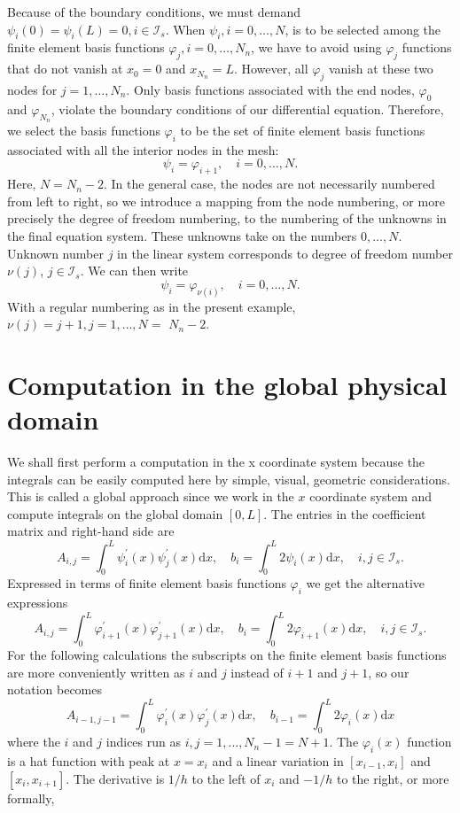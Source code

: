 \documentclass[../main.tex]{subfiles}
\begin{document}
		\noindent Because of the boundary conditions, we must demand $\psi_{i}(0)=\psi_{i}(L)=0, i \in \mathcal{I}_{s}$. When $\psi_{i}, i=0, \ldots, N$, is to be selected among the finite element basis functions $\varphi_{j}, i=0, \ldots, N_{n}$, we have to avoid using $\varphi_{j}$ functions that do not vanish at $x_{0}=0$ and $x_{N_{n}}=L$. However, all $\varphi_{j}$ vanish at these two nodes for $j=1, \ldots, N_{n}$. Only basis functions associated with the end nodes, $\varphi_{0}$ and $\varphi_{N_{n}}$, violate the boundary conditions of our differential equation. Therefore, we select the basis functions $\varphi_{i}$ to be the set of finite element basis functions associated with all the interior nodes in the mesh:
		$$
		\psi_{i}=\varphi_{i+1}, \quad i=0, \ldots, N .
		$$
		Here, $N=N_{n}-2$.\smallbreak
		In the general case, the nodes are not necessarily numbered from left to right, so we introduce a mapping from the node numbering, or more precisely the degree of freedom numbering, to the numbering of the unknowns in the final equation system. These unknowns take on the numbers $0, \ldots, N$. Unknown number $j$ in the linear system corresponds to degree of freedom number $\nu(j)$, $j \in \mathcal{I}_{s}$. We can then write
		$$
		\psi_{i}=\varphi_{\nu(i)}, \quad i=0, \ldots, N .
		$$
		With a regular numbering as in the present example, $\nu(j)=j+1, j=1, \ldots, N=$ $N_{n}-2$.
	
	\section[Computation in the global physical domain]{Computation in the global physical domain}
		\label{sec:sec_13_2}
		\noindent We shall first perform a computation in the x coordinate system because the integrals can be easily computed here by simple, visual, geometric considerations.
		This is called a global approach since we work in the $x$ coordinate system and compute integrals on the global domain $[0, L]$.\smallbreak
		The entries in the coefficient matrix and right-hand side are
		$$
		A_{i, j}=\int_{0}^{L} \psi_{i}^{\prime}(x) \psi_{j}^{\prime}(x) \mathrm{d} x, \quad b_{i}=\int_{0}^{L} 2 \psi_{i}(x) \mathrm{d} x, \quad i, j \in \mathcal{I}_{s} .
		$$
		Expressed in terms of finite element basis functions $\varphi_{i}$ we get the alternative expressions
		$$
		A_{i, j}=\int_{0}^{L} \varphi_{i+1}^{\prime}(x) \varphi_{j+1}^{\prime}(x) \mathrm{d} x, \quad b_{i}=\int_{0}^{L} 2 \varphi_{i+1}(x) \mathrm{d} x, \quad i, j \in \mathcal{I}_{s} .
		$$
		For the following calculations the subscripts on the finite element basis functions are more conveniently written as $i$ and $j$ instead of $i+1$ and $j+1$, so our notation becomes
		$$
		A_{i-1, j-1}=\int_{0}^{L} \varphi_{i}^{\prime}(x) \varphi_{j}^{\prime}(x) \mathrm{d} x, \quad b_{i-1}=\int_{0}^{L} 2 \varphi_{i}(x) \mathrm{d} x
		$$
		where the $i$ and $j$ indices run as $i, j=1, \ldots, N_{n}-1=N+1$.\smallbreak
		The $\varphi_{i}(x)$ function is a hat function with peak at $x=x_{i}$ and a linear variation in $\left[x_{i-1}, x_{i}\right]$ and $\left[x_{i}, x_{i+1}\right]$. The derivative is $1 / h$ to the left of $x_{i}$ and $-1 / h$ to the right, or more formally,
	
\end{document}
